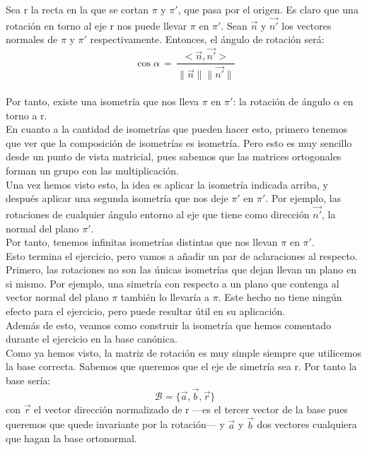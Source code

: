 \documentclass[10pt,a4paper]{article}
\theoremstyle{mystyle}
\begin{document}
Sea r la recta en la que se cortan $\pi$ y $\pi '$, que pasa por el origen. Es claro que una rotación en torno al eje r nos puede llevar $\pi$ en $\pi '$. Sean $\vec{n}$ y $\vec{n'}$ los vectores normales de $\pi$ y $\pi '$ respectivamente. Entonces, el ángulo de rotación será:\\

\[
\ \cos \alpha \, = \, \dfrac{<\vec{n},\vec{n'}>}{\|\vec{n}\|\|\vec{n'}\|}
\]\\

Por tanto, existe una isometría que nos lleva $\pi$ en $\pi '$: la rotación de ángulo $\alpha$ en torno a r.\\

En cuanto a la cantidad de isometrías que pueden hacer esto, primero tenemos que ver que la composición de isometrías es isometría. Pero esto es muy sencillo desde un punto de vista matricial, pues sabemos que las matrices ortogonales forman un grupo con las multiplicación.\\

Una vez hemos visto esto, la idea es aplicar la isometría indicada arriba, y después aplicar una segunda isometría que nos deje $\pi '$ en $\pi '$. Por ejemplo, las rotaciones de cualquier ángulo entorno al eje que tiene como dirección $\vec{n'}$, la normal del plano $\pi '$.\\

Por tanto, tenemos infinitas isometrías distintas que nos llevan $\pi$ en $\pi '$.\\

Esto termina el ejercicio, pero vamos a añadir un par de aclaraciones al respecto.\\

Primero, las rotaciones no son las únicas isometrías que dejan llevan un plano en si mismo. Por ejemplo, una simetría con respecto a un plano que contenga al vector normal del plano $\pi$ también lo llevaría a $\pi$. Este hecho no tiene ningún efecto para el ejercicio, pero puede resultar útil en su aplicación.\\

Además de esto, veamos como construir la isometría que hemos comentado durante el ejercicio en la base canónica.\\

Como ya hemos visto, la matriz de rotación es muy simple siempre que utilicemos la base correcta. Sabemos que queremos que el eje de simetría sea r. Por tanto la base sería: 
\[
\ \mathcal{B} = \{\vec{a},\vec{b},\vec{r}\}
\]
con $\vec{r}$ el vector dirección normalizado de r ---es el tercer vector de la base pues queremos que quede invariante por la rotación--- y $\vec{a}$ y $\vec{b}$ dos vectores cualquiera que hagan la base ortonormal.\\
\end{document}
